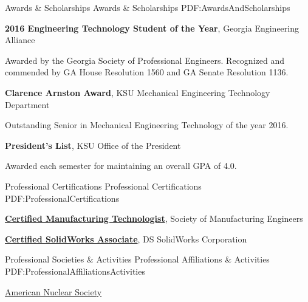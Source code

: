 \documentclass[
letterpaper,
MMMyyyy,
nonstopmode,
draftmode,
]{resume}
\begin{document}
\begin{Body}

\Section
{Awards \&\newline
Scholarships}
{Awards \& Scholarships}
{PDF:AwardsAndScholarships}

\textbf{2016 Engineering Technology Student of the Year},
Georgia Engineering Alliance
\begin{Detail}
\SubBulletItem
Awarded by the Georgia Society of Professional Engineers.
\SubBulletItem
Recognized and commended by GA House Resolution 1560 and GA Senate Resolution 1136.
\end{Detail}

\Gap

\textbf{Clarence Arnston Award},
KSU Mechanical Engineering Technology Department
\begin{Detail}
\SubBulletItem
Outstanding Senior in Mechanical Engineering Technology of the year 2016.
\end{Detail}

\Gap

\textbf{President's List},
KSU Office of the President
\begin{Detail}
\SubBulletItem
Awarded each semester for maintaining an overall GPA of 4.0.
\end{Detail}



\Section
{Professional Certifications}
{Professional Certifications}
{PDF:ProfessionalCertifications}

\textbf{\href{http://www.sme.org/cmfgt/}
{Certified Manufacturing Technologist}},
Society of Manufacturing Engineers

\textbf{\href{http://www.solidworks.com/sw/support/mcad-certification-programs.htm}
{Certified SolidWorks Associate}},
DS SolidWorks Corporation



\Section
{Professional Societies\newline
\& Activities}
{Professional Affiliations \& Activities}
{PDF:ProfessionalAffiliationsActivities}

\BulletItem
\href{http://www.ans.org/}
{American Nuclear Society}


\end{Body}
\end{document}
